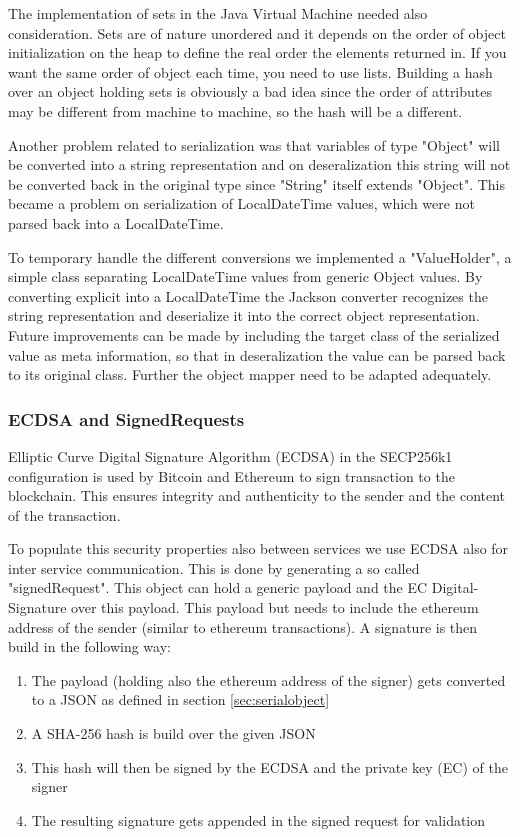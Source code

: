 The implementation of sets in the Java Virtual Machine needed also consideration. Sets are of nature unordered and it depends on the order of object initialization on the heap to define the real order the elements returned in. If you want the same order of object each time, you need to use lists. Building a hash over an object holding sets is obviously a bad idea since the order of attributes may be different from machine to machine, so the hash will be a different.  

Another problem related to serialization was that variables of type "Object" will be converted into a string representation and on deseralization this string will not be converted back in the original type since "String" itself extends "Object". This became a problem on serialization of LocalDateTime values, which were not parsed back into a LocalDateTime. 

To temporary handle the different conversions we implemented a "ValueHolder", a simple class separating LocalDateTime values from generic Object values. By converting explicit into a LocalDateTime the Jackson converter recognizes the string representation and deserialize it into the correct object representation. Future improvements can be made by including the target class of the serialized value as meta information, so that in deseralization the value can be parsed back to its original class. Further the object mapper need to be adapted adequately. 

\subsubsection{ECDSA and SignedRequests}
\label{sec:ecdsa}

Elliptic Curve Digital Signature Algorithm (ECDSA) in the SECP256k1 configuration is used by Bitcoin and Ethereum to sign transaction to the blockchain. \cite{mayer2016ecdsa} This ensures integrity and authenticity to the sender and the content of the transaction. 

To populate this security properties also between services we use ECDSA also for inter service communication. This is done by generating a so called "signedRequest". This object can hold a generic payload and the EC Digital-Signature over this payload. This payload but needs to include the ethereum address of the sender (similar to ethereum transactions). A signature is then build in the following way: 

\begin{enumerate}
\item The payload (holding also the ethereum address of the signer) gets converted to a JSON as defined in section \ref{sec:serialobject}
\item A SHA-256 hash is build over the given JSON
\item This hash will then be signed by the ECDSA and the private key (EC) of the signer
\item The resulting signature gets appended in the signed request for validation
\end{enumerate}

